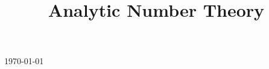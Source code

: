 

\title{Analytic Number Theory}

\usepackage[sort=standard]{glossaries} 
\makeglossaries



\maketitle
\centerline{\today}
\tableofcontents







